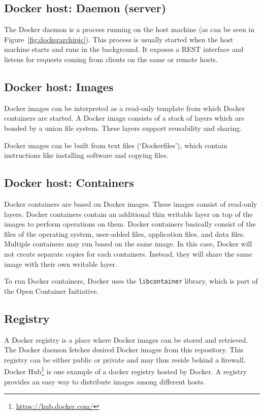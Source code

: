 \subsection{Docker host: Daemon (server)}
The Docker daemon is a process running on the host machine (as can be seen in Figure~\ref{fig:dockerarchipic}). This process is usually started when the host machine starts and runs in the background. It exposes a REST interface and listens for requests coming from clients on the same or remote hosts.

\subsection{Docker host: Images}
Docker images can be interpreted as a read-only template from which Docker containers are
started. A Docker image consists of a stack of layers which are bonded by a union file system. These layers support reusability and sharing.

Docker images can be built from text files (`Dockerfiles'), which contain instructions like installing software and copying files.

\subsection{Docker host: Containers}
Docker containers are based on Docker images. These images consist of read-only
layers. Docker containers contain an additional thin writable layer on top of the images to
perform operations on them. Docker containers basically consist of the files of the operating system,
user-added files, application files, and data files. Multiple containers may run
based on the same image. In this case, Docker will not create separate copies for
each containers. Instead, they will share the same image with their own writable layer.

To run Docker containers, Docker uses the \verb|libcontainer| library, which is part of the Open Container Initiative.

\subsection{Registry}
\label{subsec:dockerregistry}
A Docker registry is a place where Docker images can be stored and retrieved. The Docker daemon
fetches desired Docker images from this repository. This registry can be either public or private and may thus reside behind a firewall. Docker
Hub\footnote{\url{https://hub.docker.com/}} is one example of a docker registry
hosted by Docker. A registry provides an easy way to distribute images among different hosts.
